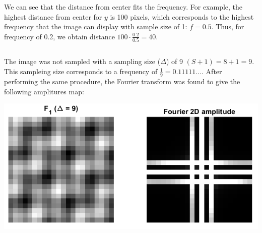 \documentclass[a4paper]{iacas}
\begin{document}
We can see that the distance from center fits the frequency. For example, the highest distance from center for $y$ is 100 pixels, which corresponds to the highest frequency that the image can display with sample size of 1: $f = 0.5$. Thus, for frequency of 0.2, we obtain distance $100\cdot \frac{0.2}{0.5} = 40$. 


\subsection{}
The image was not sampled with a sampling size ($\Delta$) of 9 $(S+1) = 8+1 = 9$. This sampleing size corresponds to a frequency of $\frac{1}{9} = 0.11111...$. After performing the same procedure, the Fourier transform was found to give the following amplitures map:

\vskip 0.1in
\begin{minipage}{0.8\textwidth}
\centering
	\includegraphics[scale=0.7]{../imgs/q1_3.png}
\end{minipage}
\vskip 0.1in
\end{document}
